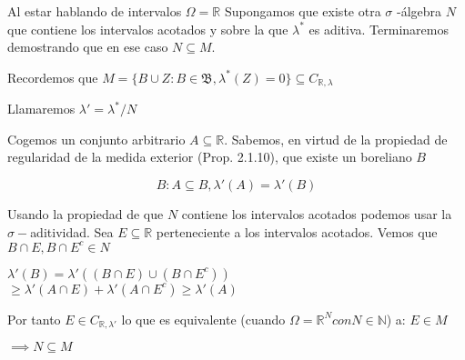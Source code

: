 
Al estar hablando de intervalos $\Omega = \mathbb{R}$
Supongamos que existe otra $\sigma$ -\'algebra $N$ que contiene los intervalos acotados y sobre la que $\lambda ^*$ es aditiva. Terminaremos demostrando que en ese caso $N \subseteq M$.

Recordemos que $M=\{B \cup Z : B\in \mathfrak{B}, \lambda ^*(Z)=0\} \subseteq C_{\mathbb{R},\lambda }$

Llamaremos $\lambda '=\lambda	^* / N$

Cogemos un conjunto arbitrario $A\subseteq \mathbb{R}$.
Sabemos, en virtud de la propiedad de regularidad de la medida exterior (Prop. 2.1.10), que existe un boreliano $B$

\[ B:A\subseteq B, \lambda '(A)=\lambda '(B) \]

Usando la propiedad de que $N$ contiene los intervalos acotados podemos usar la $\sigma-$aditividad. Sea $E\subseteq \mathbb{R}$ perteneciente a los intervalos acotados. Vemos que $B\cap E, B\cap E^c \in N$ 

$\lambda '(B) = \lambda'\left( (B\cap E) \cup (B\cap E^c) \right) $
$\geqslant\lambda '(A\cap E) + \lambda'(A\cap E^c) \geqslant \lambda '(A)$

Por tanto $E \in C_{\mathbb{R},\lambda '}$ lo que es equivalente (cuando $\Omega = \mathbb{R}^N con N\in\mathbb{N}$) a: $E \in M$

$\implies N \subseteq M$
 
